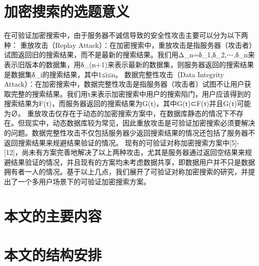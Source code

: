 \section{加密搜索的选题意义}
在可验证加密搜索中，由于服务器不诚信导致的安全性攻击主要可以分为以下两种：
	重放攻击（Replay Attack）：在加密搜索中，重放攻击是指服务器（攻击者）试图返回旧的搜索结果，而不是最新的搜索结果。我们用Δ_n={δ_1,δ_2,⋯,δ_n}来表示旧版本的数据集，用δ_(n+1)来表示最新的数据集，则服务器返回的搜索结果是数据集δ_i的搜索结果，其中1≤i≤n。
	数据完整性攻击（Data Integrity Attack）：在加密搜索中，数据完整性攻击是指服务器（攻击者）试图不让用户获取完整的搜索结果。我们用τ来表示加密搜索中用户的搜索陷门，用户应该得到的搜索结果为F(τ)，而服务器返回的搜索结果为G(τ)，其中G(τ)⊂F(τ)并且G(τ)可能为∅。
重放攻击仅存在于动态的加密搜索方案中，在数据库静态的情况下不存在。但现实中，动态数据库较为常见，因此重放攻击是可验证加密搜索必须要解决的问题。数据完整性攻击不仅包括服务器少返回搜索结果的情况还包括了服务器不返回搜索结果来规避结果验证的情况。
现有的可验证对称加密搜索方案中[5]-[12]，尚未有方案完善地解决了以上两种攻击，尤其是服务器通过返回空结果来规避结果验证的情况，并且现有的方案均未考虑数据共享，即数据用户并不只是数据拥有者一人的情况。基于以上几点，我们展开了可验证对称加密搜索的研究，并提出了一个多用户场景下的可验证加密搜索方案。

\section{本文的主要内容}

\section{本文的结构安排}
